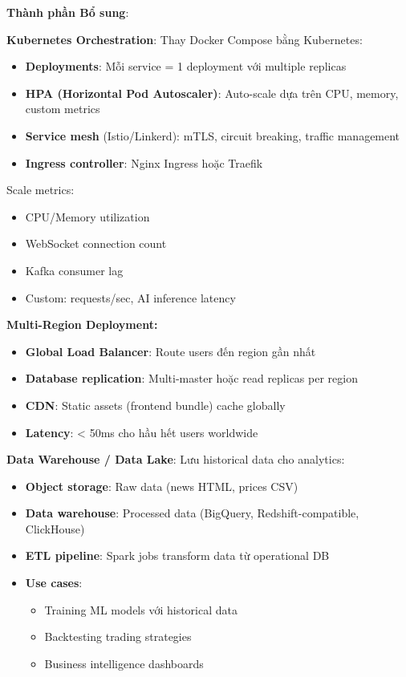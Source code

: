 \noindent\textbf{Thành phần Bổ sung}:

\textbf{Kubernetes Orchestration}:
Thay Docker Compose bằng Kubernetes:
\begin{itemize}
    \item \textbf{Deployments}: Mỗi service = 1 deployment với multiple replicas
    \item \textbf{HPA (Horizontal Pod Autoscaler)}: Auto-scale dựa trên CPU, memory, custom metrics
    \item \textbf{Service mesh} (Istio/Linkerd): mTLS, circuit breaking, traffic management
    \item \textbf{Ingress controller}: Nginx Ingress hoặc Traefik
\end{itemize}

Scale metrics:
\begin{itemize}
    \item CPU/Memory utilization
    \item WebSocket connection count
    \item Kafka consumer lag
    \item Custom: requests/sec, AI inference latency
\end{itemize}

\noindent\textbf{Multi-Region Deployment:}
\begin{itemize}
    \item \textbf{Global Load Balancer}: Route users đến region gần nhất
    \item \textbf{Database replication}: Multi-master hoặc read replicas per region
    \item \textbf{CDN}: Static assets (frontend bundle) cache globally
    \item \textbf{Latency}: < 50ms cho hầu hết users worldwide
\end{itemize}

\textbf{Data Warehouse / Data Lake}:
Lưu historical data cho analytics:
\begin{itemize}
    \item \textbf{Object storage}: Raw data (news HTML, prices CSV)
    \item \textbf{Data warehouse}: Processed data (BigQuery, Redshift-compatible, ClickHouse)
    \item \textbf{ETL pipeline}: Spark jobs transform data từ operational DB
    \item \textbf{Use cases}:
    \begin{itemize}
        \item Training ML models với historical data
        \item Backtesting trading strategies
        \item Business intelligence dashboards
    \end{itemize}
\end{itemize}

